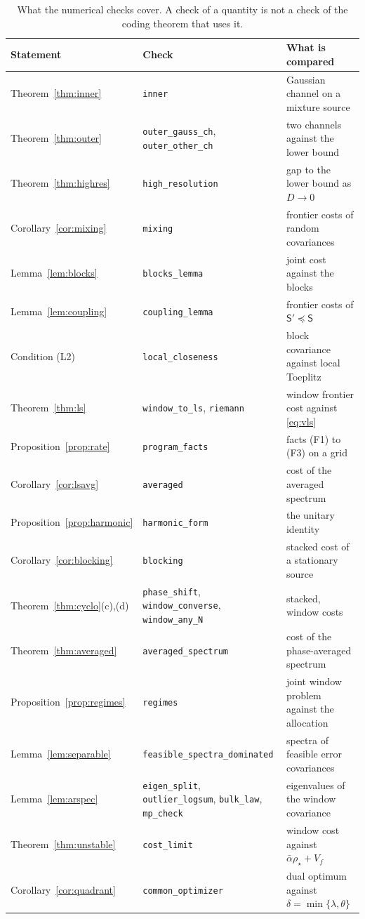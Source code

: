 \documentclass[11pt,onecolumn]{IEEEtran}
\begin{document}
\begin{table}[!t]
\centering
\footnotesize
\caption{What the numerical checks cover. A check of a quantity is not a
check of the coding theorem that uses it.}
\label{tab:checks}
\begin{tabular}{lll}
\hline
Statement & Check & What is compared\\
\hline
Theorem~\ref{thm:inner} & \texttt{inner} & Gaussian channel on a mixture source\\
Theorem~\ref{thm:outer} & \texttt{outer\_gauss\_ch}, \texttt{outer\_other\_ch} & two channels against the lower bound\\
Theorem~\ref{thm:highres} & \texttt{high\_resolution} & gap to the lower bound as $D\to0$\\
Corollary~\ref{cor:mixing} & \texttt{mixing} & frontier costs of random covariances\\
Lemma~\ref{lem:blocks} & \texttt{blocks\_lemma} & joint cost against the blocks\\
Lemma~\ref{lem:coupling} & \texttt{coupling\_lemma} & frontier costs of $\mathsf S'\preceq\mathsf S$\\
Condition (L2) & \texttt{local\_closeness} & block covariance against local Toeplitz\\
Theorem~\ref{thm:ls} & \texttt{window\_to\_ls}, \texttt{riemann} & window frontier cost against \eqref{eq:vls}\\
Proposition~\ref{prop:rate} & \texttt{program\_facts} & facts (F1) to (F3) on a grid\\
Corollary~\ref{cor:lsavg} & \texttt{averaged} & cost of the averaged spectrum\\
Proposition~\ref{prop:harmonic} & \texttt{harmonic\_form} & the unitary identity\\
Corollary~\ref{cor:blocking} & \texttt{blocking} & stacked cost of a stationary source\\
Theorem~\ref{thm:cyclo}(c),(d) & \texttt{phase\_shift}, \texttt{window\_converse}, \texttt{window\_any\_N} & stacked, window costs\\
Theorem~\ref{thm:averaged} & \texttt{averaged\_spectrum} & cost of the phase-averaged spectrum\\
Proposition~\ref{prop:regimes} & \texttt{regimes} & joint window problem against the allocation\\
Lemma~\ref{lem:separable} & \texttt{feasible\_spectra\_dominated} & spectra of feasible error covariances\\
Lemma~\ref{lem:arspec} & \texttt{eigen\_split}, \texttt{outlier\_logsum}, \texttt{bulk\_law}, \texttt{mp\_check} & eigenvalues of the window covariance\\
Theorem~\ref{thm:unstable} & \texttt{cost\_limit} & window cost against $\bar\alpha\rho_\star+V_f$\\
Corollary~\ref{cor:quadrant} & \texttt{common\_optimizer} & dual optimum against $\delta=\min\{\lambda,\theta\}$\\
\hline
\end{tabular}
\end{table}
\end{document}
